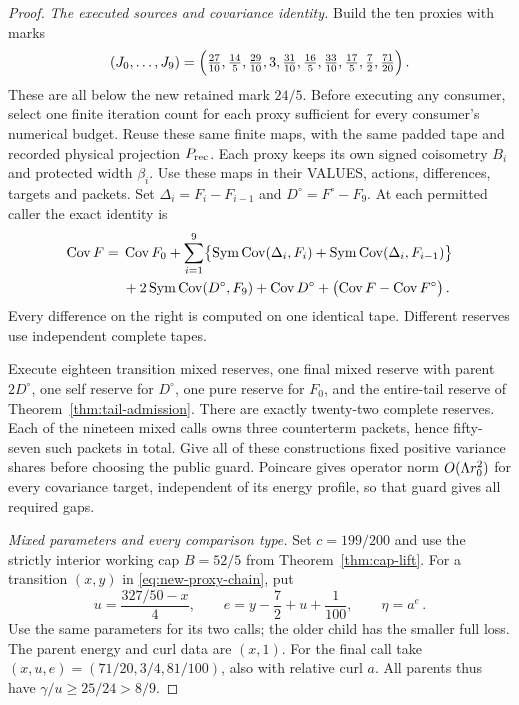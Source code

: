 \documentclass[11pt]{article}
\numberwithin{equation}{section}
\theoremstyle{remark}\newtheorem{remark}[theorem]{Remark}
\newcommand{\Sym}{\operatorname{Sym}}\newcommand{\HS}{\mathrm{HS}}
\begin{document}
\begin{proof}
\emph{The executed sources and covariance identity.}
Build the ten proxies with marks
\begin{equation}\label{eq:new-proxy-chain}
 (J_0,\ldots,J_9)=
 \Bigl(\tfrac{27}{10},\tfrac{14}{5},\tfrac{29}{10},3,
       \tfrac{31}{10},\tfrac{16}{5},\tfrac{33}{10},
       \tfrac{17}{5},\tfrac72,\tfrac{71}{20}\Bigr)\,.
\end{equation}
These are all below the new retained mark $24/5$. Before executing
any consumer, select one finite iteration count for each proxy
sufficient for every consumer's numerical budget. Reuse these same
finite maps, with the same padded tape and recorded physical
projection $P_{\rm rec}$. Each proxy keeps its own signed
coisometry $B_i$ and protected width $\beta_i$. Use these maps
in their VALUES, actions, differences, targets and packets.
Set $\Delta_i=F_i-F_{i-1}$ and $D^\circ=F^\circ-F_9$.
At each permitted caller the exact identity is
\begin{align}\label{eq:new-full-covariance}
 \Cov F={}&\Cov F_0
 +\sum_{i=1}^9\bigl\{
       \Sym\Cov(\Delta_i,F_i)+\Sym\Cov(\Delta_i,F_{i-1})\bigr\}
       \notag\\
 &+2\Sym\Cov(D^\circ,F_9)+\Cov D^\circ
       +\bigl(\Cov F-\Cov F^\circ\bigr)\,.
\end{align}
Every difference on the right is computed on one identical tape.
Different reserves use independent complete tapes.

Execute eighteen transition mixed reserves, one final mixed reserve
with parent $2D^\circ$, one self reserve for $D^\circ$, one pure
reserve for $F_0$, and the entire-tail reserve of
Theorem~\ref{thm:tail-admission}. There are exactly twenty-two
complete reserves. Each of the nineteen mixed calls owns three
counterterm packets, hence fifty-seven such packets in total.
Give all of these constructions fixed positive variance shares
before choosing the public guard. Poincare gives operator norm
$O(\Lambda r_0^2)$ for every covariance target, independent of its
energy profile, so that guard gives all required gaps.

\emph{Mixed parameters and every comparison type.}
Set $c=199/200$ and use the strictly interior working cap $B=52/5$
from Theorem~\ref{thm:cap-lift}. For a transition $(x,y)$ in
\eqref{eq:new-proxy-chain}, put
\begin{equation}\label{eq:new-transition-parameters}
 u=\frac{327/50-x}{4},\qquad
 e=y-\frac72+u+\frac1{100},\qquad \eta=a^e\,.
\end{equation}
Use the same parameters for its two calls; the older child has the
smaller full loss. The parent energy and curl data are $(x,1)$.
For the final call take $(x,u,e)=(71/20,3/4,81/100)$, also with
relative curl $a$. All parents thus have $\gamma/u\ge25/24>8/9$.


\end{proof}
\end{document}
